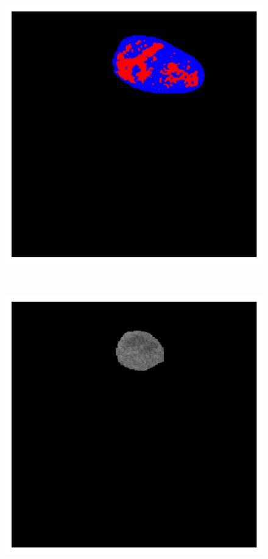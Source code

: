 {\begin{figure}[!ht]
\begin{mdframed}[backgroundcolor=blue!50,linecolor=blue!50]
\begin{minipage}{4cm}
	\end{minipage} \hspace{-0.3cm}
	\begin{minipage}{4cm}
		\includegraphics[width=\linewidth]{images/NecrosisVE_Pred_Pat0_8}
	\end{minipage} \\
	\begin{minipage}{4cm}
		\includegraphics[width=\linewidth]{images/NecrosisVE_Raw_Pat0_13}

\end{minipage}
\end{mdframed}
\end{figure}}
